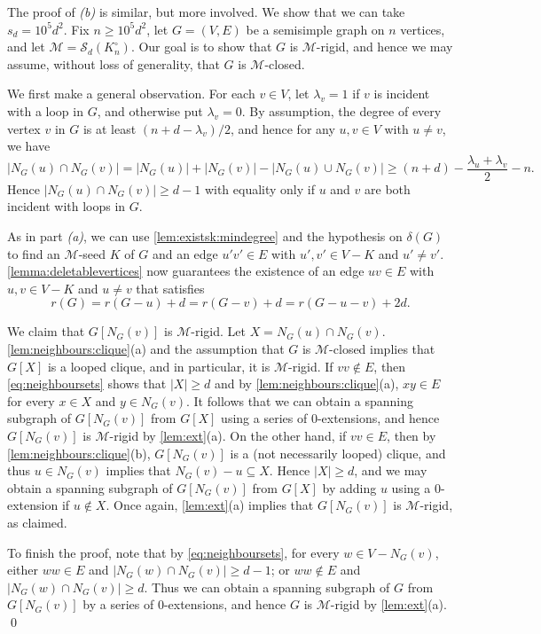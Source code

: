 \documentclass[11pt,a4paper,dvipsnames]{scrartcl}
\newcommand{\cS}{{\mathcal{S}}}
\newcommand{\cM}{{\mathcal{M}}}
\begin{document}
The proof of \emph{(b)} is similar, but more involved. We show that we can take $s_d = 10^5d^2$.
Fix $n \geq 10^5d^2$, let $G = (V,E)$ be a semisimple graph on $n$ vertices, and let $\cM = \cS_d(K_n^\circ)$. Our goal is to show that $G$ is $\cM$-rigid, and hence we may assume, without loss of generality, that $G$ is $\cM$-closed. 

We first make a general observation. For each $v\in V$, let $\lambda_v=1$ if $v$ is incident with a loop in $G$, and otherwise put $\lambda_v=0$. By assumption, the degree of every vertex $v$ in $G$ is at least $(n+d-\lambda_v)/2$, and hence for any $u,v \in V$ with $u \neq v$, we have
\begin{equation}\label{eq:neighboursets}
    |N_G(u) \cap N_G(v)| = |N_G(u)| + |N_G(v)| - |N_G(u) \cup N_G(v)| \geq (n+d) - \frac{\lambda_u + \lambda_v}{2} - n.
\end{equation}
Hence $|N_G(u) \cap N_G(v)| \geq d-1$ with equality only if $u$ and $v$ are both incident with loops in $G$.

As in part \emph{(a)}, we can use \cref{lem:existsk:mindegree} 
and the hypothesis on $\delta(G)$ to find an $\cM$-seed $K$ of $G$ and an edge $u'v' \in E$ with $u',v' \in V-K$ and $u' \neq v'$. \cref{lemma:deletablevertices} now guarantees the existence of an edge $uv \in E$ with $u,v \in V-K$ and $u \neq v$ that satisfies \[r(G) = r(G-u) + d = r(G-v) + d = r(G-u-v) + 2d.\]

We claim that $G[N_G(v)]$ is $\cM$-rigid. Let $X = N_G(u) \cap N_G(v)$. \cref{lem:neighbours:clique}(a) and the assumption that $G$ is $\cM$-closed implies that $G[X]$ is a looped clique, and in particular, it is $\cM$-rigid. If $vv \notin E$, then \cref{eq:neighboursets} shows that $|X| \geq d$ and by \cref{lem:neighbours:clique}(a), $xy \in E$ for every $x \in X$ and $y \in N_G(v)$. It follows that we can obtain a spanning subgraph of $G[N_G(v)]$ from $G[X]$ using a series of $0$-extensions, and hence $G[N_G(v)]$ is $\cM$-rigid by \cref{lem:ext}(a). On the other hand, if $vv \in E$, then by \cref{lem:neighbours:clique}(b), $G[N_G(v)]$ is a (not necessarily looped) clique, and thus $u \in N_G(v)$ implies that $N_G(v) - u \subseteq X$. Hence $|X| \geq d$, and we may obtain a spanning subgraph of $G[N_G(v)]$ from $G[X]$ by adding $u$ using a 0-extension if $u\not\in X$. Once again, \cref{lem:ext}(a) implies that $G[N_G(v)]$ is $\cM$-rigid, as claimed.

To finish the proof, note that by \cref{eq:neighboursets}, for every $w\in V- N_G(v)$, 
either $ww\in E$ and $|N_G(w)\cap N_G(v)|\geq d-1$; or $ww \notin E$ and $|N_G(w)\cap N_G(v)|\geq d$. Thus we can obtain a spanning subgraph of $G$ from $G[N_G(v)]$ by a series of 0-extensions, and hence $G$ is $\cM$-rigid by \cref{lem:ext}(a). 
\qed
\end{document}
